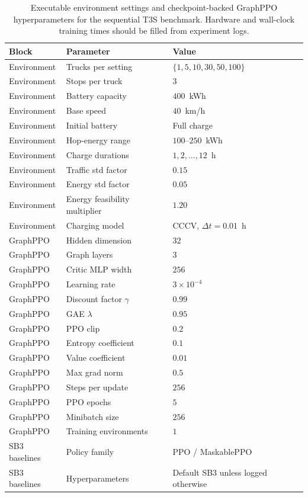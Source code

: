 \begin{table}[t]
\centering
\small
\begin{tabular}{@{}lll@{}}
\toprule
Block & Parameter & Value \\
\midrule
Environment & Trucks per setting & $\{1, 5, 10, 30, 50, 100\}$ \\
Environment & Stops per truck & $3$ \\
Environment & Battery capacity & $400$~kWh \\
Environment & Base speed & $40$~km/h \\
Environment & Initial battery & Full charge \\
Environment & Hop-energy range & $100$--$250$~kWh \\
Environment & Charge durations & $1,2,\dots,12$~h \\
Environment & Traffic std factor & $0.15$ \\
Environment & Energy std factor & $0.05$ \\
Environment & Energy feasibility multiplier & $1.20$ \\
Environment & Charging model & CCCV, $\Delta t = 0.01$~h \\
\midrule
GraphPPO & Hidden dimension & $32$ \\
GraphPPO & Graph layers & $3$ \\
GraphPPO & Critic MLP width & $256$ \\
GraphPPO & Learning rate & $3\times 10^{-4}$ \\
GraphPPO & Discount factor $\gamma$ & $0.99$ \\
GraphPPO & GAE $\lambda$ & $0.95$ \\
GraphPPO & PPO clip & $0.2$ \\
GraphPPO & Entropy coefficient & $0.1$ \\
GraphPPO & Value coefficient & $0.01$ \\
GraphPPO & Max grad norm & $0.5$ \\
GraphPPO & Steps per update & $256$ \\
GraphPPO & PPO epochs & $5$ \\
GraphPPO & Minibatch size & $256$ \\
GraphPPO & Training environments & $1$ \\
\midrule
SB3 baselines & Policy family & PPO / MaskablePPO \\
SB3 baselines & Hyperparameters & Default SB3 unless logged otherwise \\
\bottomrule
\end{tabular}
\caption{Executable environment settings and checkpoint-backed GraphPPO hyperparameters for the sequential T3S benchmark. Hardware and wall-clock training times should be filled from experiment logs.}
\label{tab:exp-hparams}
\end{table}

